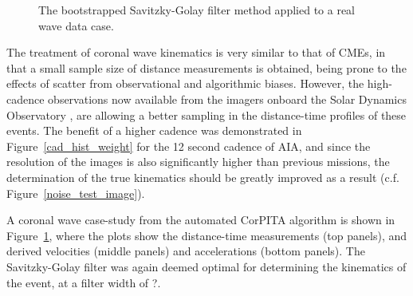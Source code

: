 \documentclass[structabstract]{aa}
\begin{document}
\begin{figure}[!t]
\centering
{}
\caption{The bootstrapped Savitzky-Golay filter method applied to a real wave data case.} %
\label{fig_savgol_wave}
\end{figure}

The treatment of coronal wave kinematics is very similar to that of CMEs, in that a small sample size of distance measurements is obtained, being prone to the effects of scatter from observational and algorithmic biases. However, the high-cadence observations now available from the imagers onboard the Solar Dynamics Observatory \citep[SDO; ][]{}, are allowing a better sampling in the distance-time profiles of these events. The benefit of a higher cadence was demonstrated in Figure~\ref{cad_hist_weight} for the 12 second cadence of AIA, and since the resolution of the images is also significantly higher than previous missions, the determination of the true kinematics should be greatly improved as a result (c.f. Figure~\ref{noise_test_image}).

A coronal wave case-study from the automated CorPITA algorithm is shown in Figure~\ref{fig_savgol_wave}, where the plots show the distance-time measurements (top panels), and derived velocities (middle panels) and accelerations (bottom panels). The Savitzky-Golay filter was again deemed optimal for determining the kinematics of the event, at a filter width of ?.
\end{document}

